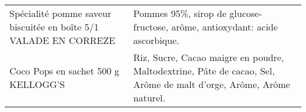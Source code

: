 \begin{longtable}{p{5cm}p{10cm}}
                                         Spécialité pomme saveur biscuitée en boîte 5/1 VALADE EN CORREZE &                                                                                                                                                                                                                                                                                                                                                                                                                                                                                                                                                                                                                                                                                                                                                                                                                                                                                                                                                             Pommes 95\%, sirop de glucose-fructose, arôme, antioxydant: acide ascorbique. \\
                                                                      Coco Pops en sachet 500 g KELLOGG'S &                                                                                                                                                                                                                                                                                                                                                                                                                                                                                                                                                                                                                                                                                                                                                                                                                                                                                                                       Riz, Sucre, Cacao maigre en poudre, Maltodextrine, Pâte de cacao, Sel, Arôme de malt d'orge, Arôme, Arôme naturel. \\

\end{longtable}
